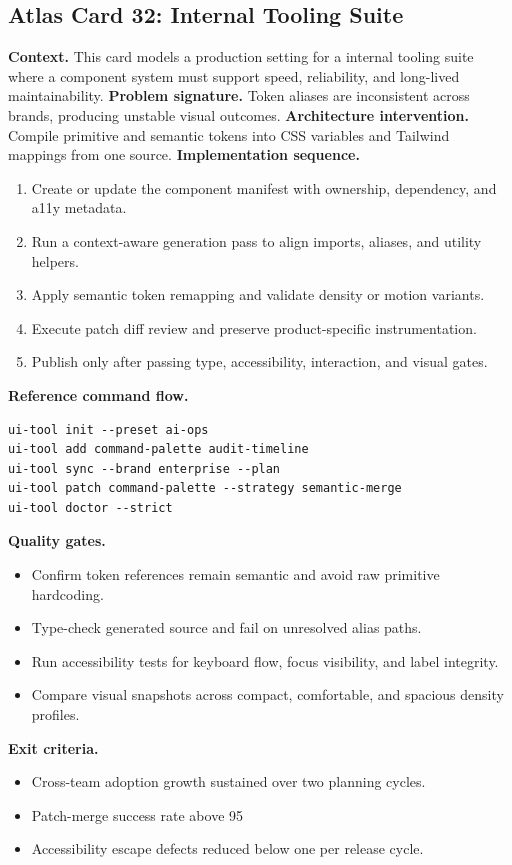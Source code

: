 \subsection*{Atlas Card 32: Internal Tooling Suite}
\textbf{Context.} This card models a production setting for a internal tooling suite where a component system must support speed, reliability, and long-lived maintainability.
\textbf{Problem signature.} Token aliases are inconsistent across brands, producing unstable visual outcomes.
\textbf{Architecture intervention.} Compile primitive and semantic tokens into CSS variables and Tailwind mappings from one source.
\textbf{Implementation sequence.}
\begin{enumerate}[leftmargin=*, itemsep=0.28em]
  \item Create or update the component manifest with ownership, dependency, and a11y metadata.
  \item Run a context-aware generation pass to align imports, aliases, and utility helpers.
  \item Apply semantic token remapping and validate density or motion variants.
  \item Execute patch diff review and preserve product-specific instrumentation.
  \item Publish only after passing type, accessibility, interaction, and visual gates.
\end{enumerate}
\textbf{Reference command flow.}
\begin{verbatim}
ui-tool init --preset ai-ops
ui-tool add command-palette audit-timeline
ui-tool sync --brand enterprise --plan
ui-tool patch command-palette --strategy semantic-merge
ui-tool doctor --strict
\end{verbatim}
\textbf{Quality gates.}
\begin{itemize}[leftmargin=*, itemsep=0.24em]
  \item Confirm token references remain semantic and avoid raw primitive hardcoding.
  \item Type-check generated source and fail on unresolved alias paths.
  \item Run accessibility tests for keyboard flow, focus visibility, and label integrity.
  \item Compare visual snapshots across compact, comfortable, and spacious density profiles.
\end{itemize}
\textbf{Exit criteria.}
\begin{itemize}[leftmargin=*, itemsep=0.24em]
  \item Cross-team adoption growth sustained over two planning cycles.
  \item Patch-merge success rate above 95%
  \item Accessibility escape defects reduced below one per release cycle.
\end{itemize}
\clearpage
